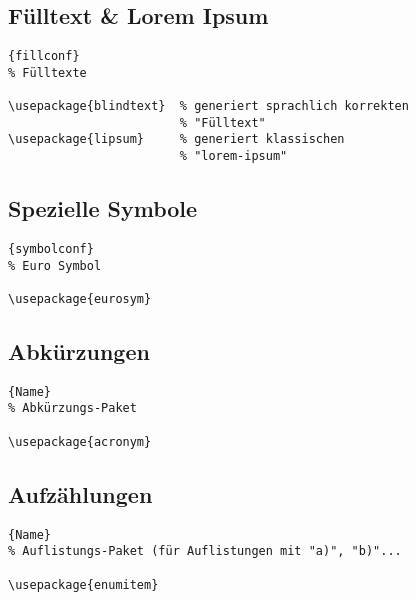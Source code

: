 \subsection{Fülltext \& Lorem Ipsum}

\begin{center}
\begin{lstlisting}[caption=Fuelltext]{fillconf}
% Fülltexte

\usepackage{blindtext}  % generiert sprachlich korrekten
                        % "Fülltext"
\usepackage{lipsum}     % generiert klassischen
                        % "lorem-ipsum"
\end{lstlisting}
\end{center}

\subsection{Spezielle Symbole}

\begin{center}
\begin{lstlisting}[caption=Euro-Symbol]{symbolconf}
% Euro Symbol

\usepackage{eurosym}
\end{lstlisting}
\end{center}

\subsection{Abkürzungen}

\begin{center}
\begin{lstlisting}[caption=Abkuerzungen]{Name}
% Abkürzungs-Paket 

\usepackage{acronym}
\end{lstlisting}
\end{center}

\subsection{Aufzählungen}

\begin{center}
\begin{lstlisting}[caption=Auflistungen]{Name}
% Auflistungs-Paket (für Auflistungen mit "a)", "b)"...

\usepackage{enumitem}
\end{lstlisting}
\end{center}


